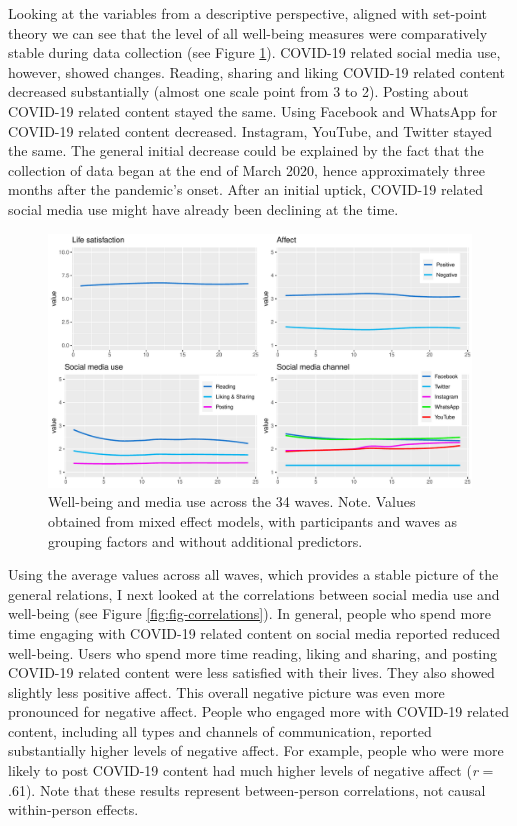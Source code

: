 \documentclass[
  man,mask,floatsintext]{apa7}
\begin{document}
Looking at the variables from a descriptive perspective, aligned with set-point theory we can see that the level of all well-being measures were comparatively stable during data collection (see Figure \ref{fig:fig-descriptives}).
COVID-19 related social media use, however, showed changes.
Reading, sharing and liking COVID-19 related content decreased substantially (almost one scale point from 3 to 2).
Posting about COVID-19 related content stayed the same.
Using Facebook and WhatsApp for COVID-19 related content decreased.
Instagram, YouTube, and Twitter stayed the same.
The general initial decrease could be explained by the fact that the collection of data began at the end of March 2020, hence approximately three months after the pandemic's onset.
After an initial uptick, COVID-19 related social media use might have already been declining at the time.

\begin{figure}
\includegraphics[width=\textwidth]{figures/fig_descriptives} \caption{Well-being and media use across the 34 waves. Note. Values obtained from mixed effect models, with participants and waves as grouping factors and without additional predictors.}\label{fig:fig-descriptives}
\end{figure}

Using the average values across all waves, which provides a stable picture of the general relations, I next looked at the correlations between social media use and well-being (see Figure \ref{fig:fig-correlations}).
In general, people who spend more time engaging with COVID-19 related content on social media reported reduced well-being.
Users who spend more time reading, liking and sharing, and posting COVID-19 related content were less satisfied with their lives.
They also showed slightly less positive affect.
This overall negative picture was even more pronounced for negative affect.
People who engaged more with COVID-19 related content, including all types and channels of communication, reported substantially higher levels of negative affect.
For example, people who were more likely to post COVID-19 content had much higher levels of negative affect (\emph{r} = .61).
Note that these results represent between-person correlations, not causal within-person effects.
\end{document}
